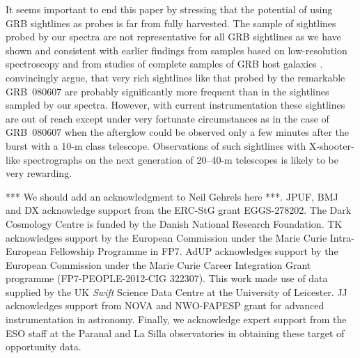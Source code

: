 \documentclass{aa}    %
\begin{document}

It seems important to end this paper by stressing that the potential of using
GRB sightlines as probes is far from fully harvested. The sample of sightlines
probed by our spectra are not representative for all GRB sightlines as we have
shown and consistent with earlier findings from samples based on low-resolution
spectroscopy \citep[e.g.,][]{Fynbo2009} and from studies of complete samples of
GRB host galaxies \citep{Hjorth2012, Covino2013, Perley2016}. \cite{Kruhler2013}
convincingly argue, that very rich sightlines like that probed by the remarkable
GRB~080607 \citep{Prochaska2009} are probably significantly more frequent than
in the sightlines sampled by our spectra. However, with current instrumentation
these sightlines are out of reach except under very fortunate circumstances as
in the case of GRB~080607 when the afterglow could be observed only a few
minutes after the burst with a 10-m class telescope. Observations of such
sightlines with X-shooter-like spectrographs on the next generation of 20--40-m
telescopes is likely to be very rewarding.

\begin{acknowledgements}
	*** We should add an acknowledgment to Neil Gehrels here ***. JPUF, BMJ and DX acknowledge
support from the ERC-StG grant EGGS-278202.  The Dark Cosmology Centre is
funded by the Danish National Research Foundation.  TK acknowledges support by
the European Commission under the Marie Curie Intra-European Fellowship
Programme in FP7.  AdUP acknowledges support by the European Commission under
the Marie Curie Career Integration Grant programme (FP7-PEOPLE-2012-CIG
322307).  This work made use of data supplied by the UK {\it Swift} Science
Data Centre at the University of Leicester. JJ acknowledges support from NOVA
and NWO-FAPESP grant for advanced instrumentation in astronomy. Finally, we
acknowledge expert support from the ESO staff at the Paranal and La Silla
observatories in obtaining these target of opportunity data.
	
\end{acknowledgements}
\end{document}
